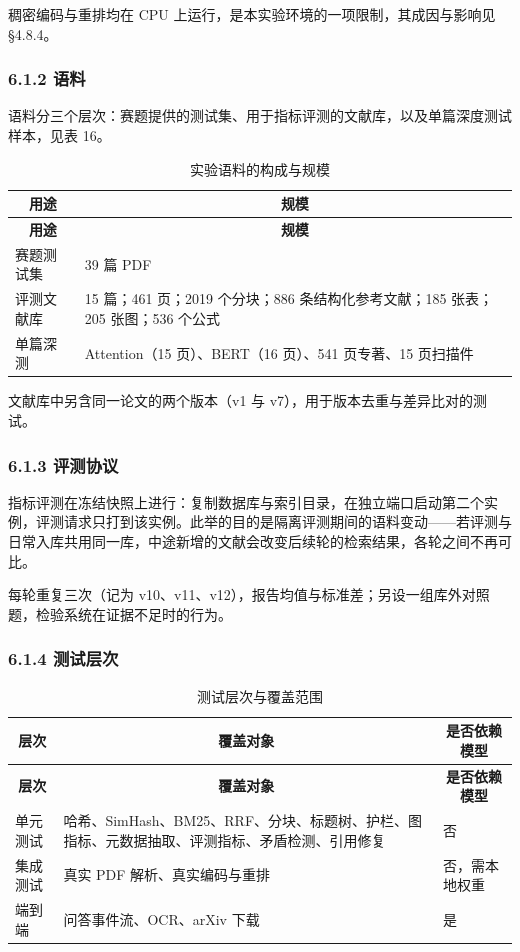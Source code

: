 \documentclass[UTF8,fontset=windows,zihao=5,a4paper]{ctexart}
\begin{document}
稠密编码与重排均在 CPU 上运行，是本实验环境的一项限制，其成因与影响见 §4.8.4。

\subsubsection*{6.1.2 语料}
语料分三个层次：赛题提供的测试集、用于指标评测的文献库，以及单篇深度测试样本，见表 16。

\begin{longtable}{@{}p{}p{}@{}}
\caption{实验语料的构成与规模}\\
\toprule
\multicolumn{1}{c}{\textbf{用途}} & \multicolumn{1}{c}{\textbf{规模}} \\
\midrule
\endfirsthead
\toprule
\multicolumn{1}{c}{\textbf{用途}} & \multicolumn{1}{c}{\textbf{规模}} \\
\midrule
\endhead
\bottomrule
\endfoot
赛题测试集 & 39 篇 PDF \\
评测文献库 & 15 篇；461 页；2019 个分块；886 条结构化参考文献；185 张表；205 张图；536 个公式 \\
单篇深测 & Attention（15 页）、BERT（16 页）、541 页专著、15 页扫描件 \\
\end{longtable}

文献库中另含同一论文的两个版本（v1 与 v7），用于版本去重与差异比对的测试。

\subsubsection*{6.1.3 评测协议}
指标评测在冻结快照上进行：复制数据库与索引目录，在独立端口启动第二个实例，评测请求只打到该实例。此举的目的是隔离评测期间的语料变动——若评测与日常入库共用同一库，中途新增的文献会改变后续轮的检索结果，各轮之间不再可比。

每轮重复三次（记为 v10、v11、v12），报告均值与标准差；另设一组库外对照题，检验系统在证据不足时的行为。

\subsubsection*{6.1.4 测试层次}
\begin{longtable}{@{}p{}p{}p{}@{}}
\caption{测试层次与覆盖范围}\\
\toprule
\multicolumn{1}{c}{\textbf{层次}} & \multicolumn{1}{c}{\textbf{覆盖对象}} & \multicolumn{1}{c}{\textbf{是否依赖模型}} \\
\midrule
\endfirsthead
\toprule
\multicolumn{1}{c}{\textbf{层次}} & \multicolumn{1}{c}{\textbf{覆盖对象}} & \multicolumn{1}{c}{\textbf{是否依赖模型}} \\
\midrule
\endhead
\bottomrule
\endfoot
单元测试 & 哈希、SimHash、BM25、RRF、分块、标题树、护栏、图指标、元数据抽取、评测指标、矛盾检测、引用修复 & 否 \\
集成测试 & 真实 PDF 解析、真实编码与重排 & 否，需本地权重 \\
端到端 & 问答事件流、OCR、arXiv 下载 & 是 \\
\end{longtable}
\end{document}
